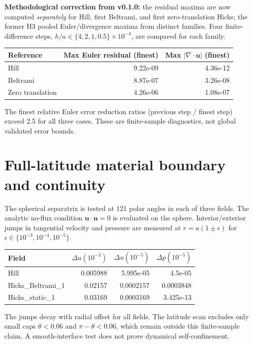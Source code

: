 \documentclass[10pt,a4paper]{article}
\begin{document}
\textbf{Methodological correction from v0.1.0:} the residual maxima are now computed \emph{separately} for Hill, first Beltrami, and first zero-translation Hicks; the former H3 pooled Euler/divergence maxima from distinct families. Four finite-difference steps, $h/a\in\{4,2,1,0.5\}\times10^{-4}$, are compared for each family.

\begin{center}\small
\begin{tabular}{lrr}
\toprule
Reference & Max Euler residual (finest) & Max $|\nabla\cdot\mathbf u|$ (finest)\\
\midrule
Hill & 9.22e-09 & 4.36e-12\\
Beltrami & 8.87e-07 & 3.26e-08\\
Zero translation & 4.26e-06 & 1.08e-07\\
\bottomrule
\end{tabular}
\end{center}
The finest relative Euler error reduction ratios (previous step / finest step) exceed 2.5 for all three cases. These are finite-sample diagnostics, not global validated error bounds.

\section{Full-latitude material boundary and continuity}
The spherical separatrix is tested at 121 polar angles in each of three fields. The analytic no-flux condition $\mathbf u\cdot\mathbf n=0$ is evaluated on the sphere. Interior/exterior jumps in tangential velocity and pressure are measured at $r=a(1\pm\epsilon)$ for $\epsilon\in\{10^{-3},10^{-4},10^{-5}\}$.

\begin{center}\small
\begin{tabular}{lrrr}
\toprule
Field & $\Delta u(10^{-3})$ & $\Delta u(10^{-5})$ & $\Delta p(10^{-5})$\\
\midrule
Hill & 0.005988 & 5.995e-05 & 4.5e-05 \\
Hicks\_Beltrami\_1 & 0.02157 & 0.0002157 & 0.0003848 \\
Hicks\_static\_1 & 0.03169 & 0.0003169 & 3.425e-13 \\
\bottomrule
\end{tabular}
\end{center}
The jumps decay with radial offset for all fields. The latitude scan excludes only small caps $\theta<0.06$ and $\pi-\theta<0.06$, which remain outside this finite-sample claim. A smooth-interface test does not prove dynamical self-confinement.
\end{document}
